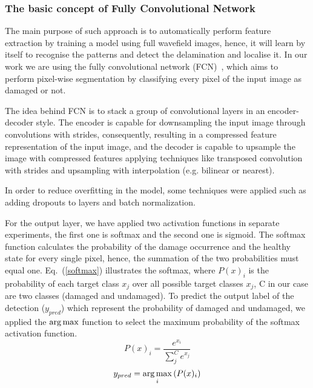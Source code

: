\subsubsection{The basic concept of Fully Convolutional Network}
The main purpose of such approach is to automatically perform feature extraction by training a model using full wavefield images, hence, it will learn by itself to recognise the patterns and detect the delamination and localise it.
In our work we are using the fully convolutional network (FCN)~\cite{long2015fully}, which aims to perform pixel-wise segmentation by classifying every pixel of the input image as damaged or not. 

The idea behind FCN is to stack a group of convolutional layers in an encoder-decoder style. 
The encoder is capable for downsampling the input image through convolutions with strides, consequently, resulting in a compressed feature representation of the input image, and the decoder is capable to upsample the image with compressed features applying techniques like transposed convolution with strides and upsampling with interpolation (e.g. bilinear or nearest).


In order to reduce overfitting in the model, some techniques were applied such as adding dropouts to layers and batch normalization.

For the output layer, we have applied two activation functions in separate experiments, the first one is softmax and the second one is sigmoid. 
The softmax function calculates the probability of the damage occurrence and the healthy state for every single pixel, hence, the summation of the two probabilities must equal one. Eq.~(\ref{softmax}) illustrates the softmax, where \(P(x)_{i}\) is the probability of each target class \(x_{j}\) over all possible target classes \(x_{j}\), C in our case are two classes  (damaged and undamaged).
To predict the output label of the detection (\(y_{pred}\)) which represent the probability of damaged and undamaged, we applied the \(\operatorname*{arg\,max}\) function to select the maximum probability of the softmax activation function.
	\begin{equation}
		P(x)_{i} = \frac{e^{x_{i}}}{\sum_{j}^{C} e^{x_{j}}}
		\label{softmax}
	\end{equation} 
	\begin{equation}
		y_{pred} = \operatorname*{arg\,max}_{i}\left( P(x)_{i} \right)
		\label{argmax}
	\end{equation}

